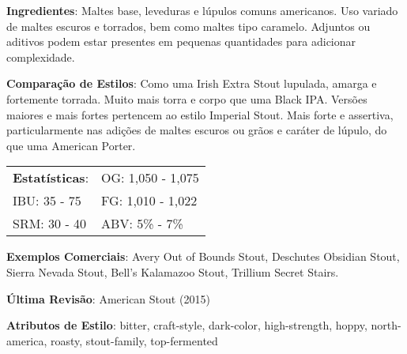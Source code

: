 \textbf{Ingredientes}: Maltes base, leveduras e lúpulos comuns americanos. Uso variado de maltes escuros e torrados, bem como maltes tipo caramelo. Adjuntos ou aditivos podem estar presentes em pequenas quantidades para adicionar complexidade.

\textbf{Comparação de Estilos}: Como uma Irish Extra Stout lupulada, amarga e fortemente torrada. Muito mais torra e corpo que uma Black IPA. Versões maiores e mais fortes pertencem ao estilo Imperial Stout. Mais forte e assertiva, particularmente nas adições de maltes escuros ou grãos e caráter de lúpulo, do que uma American Porter.

\begin{tabular}{@{}p{35mm}p{35mm}@{}}
  \textbf{Estatísticas}: & OG: 1,050 - 1,075 \\
  IBU: 35 - 75  & FG: 1,010 - 1,022 \\
  SRM: 30 - 40  & ABV: 5\% - 7\%
\end{tabular}

\textbf{Exemplos Comerciais}: Avery Out of Bounds Stout, Deschutes Obsidian Stout, Sierra Nevada Stout, Bell’s Kalamazoo Stout, Trillium Secret Stairs.

\textbf{Última Revisão}: American Stout (2015)

\textbf{Atributos de Estilo}: bitter, craft-style, dark-color, high-strength, hoppy, north-america, roasty, stout-family, top-fermented
